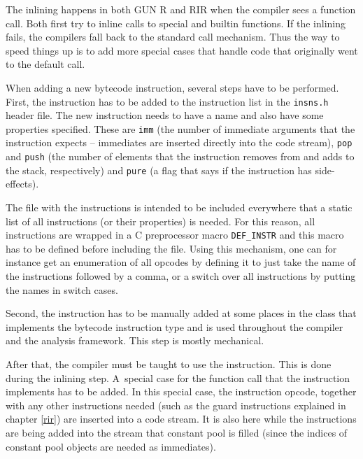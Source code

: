 
The inlining happens in both GUN R and RIR when the compiler sees a function call. Both first try to inline calls to special and builtin functions. If the inlining fails, the compilers fall back to the standard call mechanism. Thus the way to speed things up is to add more special cases that handle code that originally went to the default call.


When adding a new bytecode instruction, several steps have to be performed. First, the instruction has to be added to the instruction list in the \verb/insns.h/ header file. The new instruction needs to have a name and also have some properties specified. These are \verb/imm/ (the number of immediate arguments that the instruction expects -- immediates are inserted directly into the code stream), \verb/pop/ and \verb/push/ (the number of elements that the instruction removes from and adds to the stack, respectively) and \verb/pure/ (a flag that says if the instruction has side-effects).


The file with the instructions is intended to be included everywhere that a static list of all instructions (or their properties) is needed. For this reason, all instructions are wrapped in a C preprocessor macro \verb/DEF_INSTR/ and this macro has to be defined before including the file. Using this mechanism, one can for instance get an enumeration of all opcodes by defining it to just take the name of the instructions followed by a comma, or a switch over all instructions by putting the names in switch cases.


Second, the instruction has to be manually added at some places in the class that implements the bytecode instruction type and is used throughout the compiler and the analysis framework. This step is mostly mechanical.

After that, the compiler must be taught to use the instruction. This is done during the inlining step. A~special case for the function call that the instruction implements has to be added. In this special case, the instruction opcode, together with any other instructions needed (such as the guard instructions explained in chapter \ref{rir}) are inserted into a code stream. It is also here while the instructions are being added into the stream that constant pool is filled (since the indices of constant pool objects are needed as immediates).

